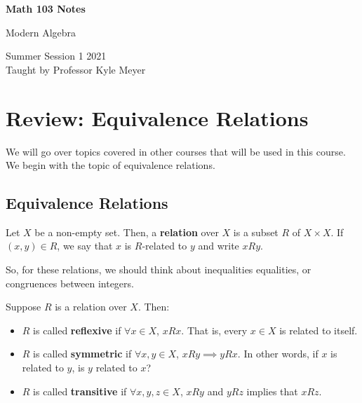 \documentclass[letterpaper]{article}
\begin{document}
\begin{titlepage}
    \begin{center}
        \vspace*{1cm}
            
        \Huge
        \textbf{Math 103 Notes}
            
        \vspace{0.5cm}
        \LARGE
        Modern Algebra
            
        \vspace{1.5cm}
            
        \vfill
            
        Summer Session 1 2021\\
        Taught by Professor Kyle Meyer
    \end{center}
\end{titlepage}


\newpage 

\begingroup
    \renewcommand\contentsname{Table of Contents}
    \tableofcontents
\endgroup

\newpage
{}

\section{Review: Equivalence Relations}
We will go over topics covered in other courses that will be used in this course. We begin with the topic of equivalence relations. 

\subsection{Equivalence Relations}
Let $X$ be a non-empty set. Then, a \textbf{relation} over $X$ is a subset $R$ of $X \times X$. If $(x, y) \in R$, we say that $x$ is $R$-related to $y$ and write $x R y$. 

\bigskip 

So, for these relations, we should think about inequalities equalities, or congruences between integers. 

\bigskip 

Suppose $R$ is a relation over $X$. Then:
\begin{itemize}
    \item $R$ is called \textbf{reflexive} if $\forall x \in X$, $x R x$. That is, every $x \in X$ is related to itself. 
    \item $R$ is called \textbf{symmetric} if $\forall x, y \in X$, $x R y \implies y R x$. In other words, if $x$ is related to $y$, is $y$ related to $x$? 
    \item $R$ is called \textbf{transitive} if $\forall x, y, z \in X$, $x R y$ and $y R z$ implies that $x R z$. 
\end{itemize}
\end{document}
